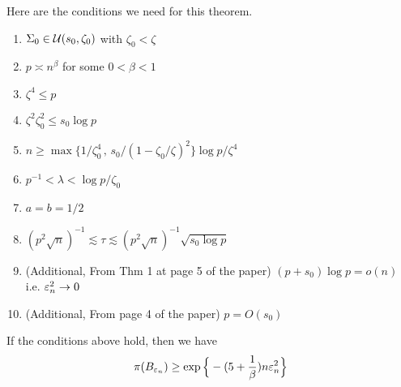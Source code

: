 \begin{theorem*}
    Here are the conditions we need for this theorem.
    \begin{enumerate}
        \item $\Sigma_0 \in \mathcal{U}(s_0, \zeta_0)$ with $\zeta_0 <\zeta$
        \item $p \asymp n^\beta$ for some $0<\beta<1$
        \item $\zeta^4\leq p$
        \item $\zeta^2\zeta_0^2 \leq s_0\log p$
        \item $n \geq \max \{1/\zeta_0^4\, , \,s_0/ (1-\zeta_0/\zeta)^2 \} \log p/\zeta^4$
        \item $p^{-1}<\lambda < \log p/\zeta_0$
        \item $a=b=1/2$
        \item $(p^2\sqrt{n})^{-1}\lesssim \tau \lesssim (p^2\sqrt{n})^{-1}\sqrt{s_0\log p}$ 
        \item (Additional, From Thm 1 at page 5 of the paper) \; $(p+s_0)\log p = o(n)$ i.e. $\varepsilon_n^2 \rightarrow 0$
        \item (Additional, From page 4 of the paper) \; $p = O(s_0)$
    \end{enumerate}
    If the conditions above hold, then we have \[\pi(B_{\varepsilon_n})\geq \exp\Big\{-(5+\frac 1\beta )n\varepsilon_n^2 \Big\}\]
\end{theorem*}

